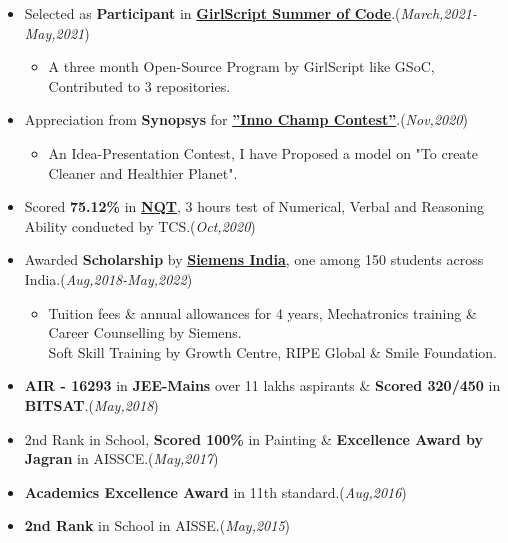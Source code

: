 \documentclass[10pt]{extarticle}
\begin{document}
    \begin{itemize}
       \item Selected as \textbf{Participant} in \href{https://www.linkedin.com/posts/priyanka-soni-131668176_opensource-github-gssoc2021-activity-6768059710504628224-zK4j/}{\textbf{GirlScript Summer of Code}}.\hfill\hfill(\textit{March,2021-May,2021})
           \begin{itemize}
               \item A three month Open-Source Program by GirlScript like GSoC, Contributed to 3 repositories.
           \end{itemize}
        \item Appreciation from \textbf{Synopsys} for \href{https://www.linkedin.com/posts/priyanka-soni-131668176_ideapresentationcontest-iot-innovation-activity-6743422132929343488-fRUb/}{\textbf{”Inno Champ Contest”}}.\hfill\hfill(\textit{Nov,2020})
          \begin{itemize}
              \item An Idea-Presentation Contest, I have Proposed a model on "To create Cleaner and Healthier Planet".
          \end{itemize}
       \item Scored \textbf{75.12\%} in \href{https://drive.google.com/file/d/1FfOOm94LawOPaGOGxPQHwiO4TyZkc5h6/view}{\textbf{NQT}}, 3 hours test of Numerical, Verbal and Reasoning Ability conducted by TCS.\hfill\hfill(\textit{Oct,2020})
       \item Awarded \textbf{Scholarship} by \href{https://drive.google.com/file/d/1XFUYs_kH-7Q7BmaebOLJVNOLyD0d4iTg/view}{\textbf{Siemens India}}, one among 150 students across India.\hfill\hfill(\textit{Aug,2018-May,2022})
          \begin{itemize}
            \item Tuition fees \& annual allowances for 4 years, Mechatronics training \& Career Counselling by Siemens.\\
            Soft Skill Training by Growth Centre, RIPE Global \& Smile Foundation.
          \end{itemize}
      \item \textbf{AIR - 16293} in \textbf{JEE-Mains} over 11 lakhs aspirants \& \textbf{Scored 320/450} in \textbf{BITSAT}.\hfill\hfill(\textit{May,2018})
      \item 2nd Rank in School, \textbf{Scored 100\%} in Painting \& \textbf{Excellence Award by Jagran} in AISSCE.\hfill\hfill(\textit{May,2017})
      \item \textbf{Academics Excellence Award} in 11th standard.\hfill\hfill(\textit{Aug,2016})
      \item \textbf{2nd Rank} in School in AISSE.\hfill\hfill(\textit{May,2015})
    \end{itemize}
\end{document}
